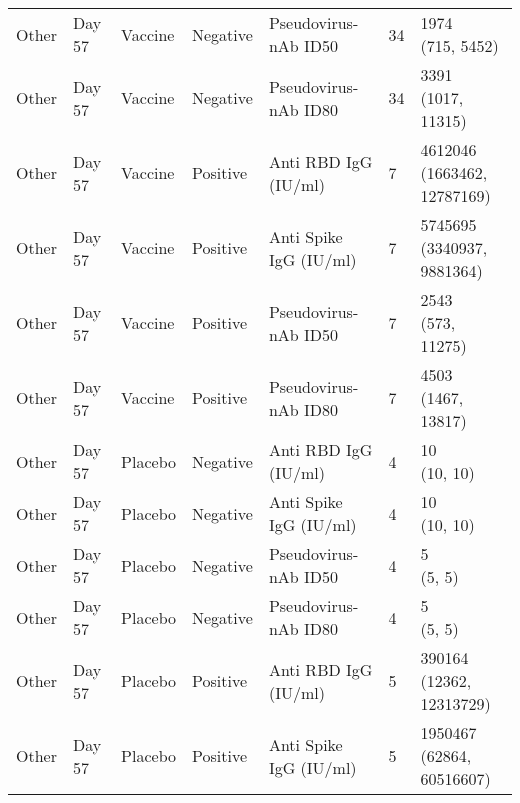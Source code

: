 \documentclass[]{book}
\theoremstyle{definition}
\theoremstyle{definition}
\theoremstyle{definition}
\newcommand{\1}{\mathbbm{1}}
\begin{document}
\begin{landscape}
\begin{ThreePartTable}
\begin{longtable}[t]{>{\raggedright\arraybackslash}p{7cm}llllll}
\hspace{1em}Other & Day 57 & Vaccine & Negative & Pseudovirus-nAb ID50 & 34 & \makecell[l]{1974\\(715, 5452)}\\
\hspace{1em}Other & Day 57 & Vaccine & Negative & Pseudovirus-nAb ID80 & 34 & \makecell[l]{3391\\(1017, 11315)}\\
\hspace{1em}Other & Day 57 & Vaccine & Positive & Anti RBD IgG (IU/ml) & 7 & \makecell[l]{4612046\\(1663462, 12787169)}\\
\hspace{1em}Other & Day 57 & Vaccine & Positive & Anti Spike IgG (IU/ml) & 7 & \makecell[l]{5745695\\(3340937, 9881364)}\\
\hspace{1em}Other & Day 57 & Vaccine & Positive & Pseudovirus-nAb ID50 & 7 & \makecell[l]{2543\\(573, 11275)}\\
\hspace{1em}Other & Day 57 & Vaccine & Positive & Pseudovirus-nAb ID80 & 7 & \makecell[l]{4503\\(1467, 13817)}\\
\hspace{1em}Other & Day 57 & Placebo & Negative & Anti RBD IgG (IU/ml) & 4 & \makecell[l]{10\\(10, 10)}\\
\hspace{1em}Other & Day 57 & Placebo & Negative & Anti Spike IgG (IU/ml) & 4 & \makecell[l]{10\\(10, 10)}\\
\hspace{1em}Other & Day 57 & Placebo & Negative & Pseudovirus-nAb ID50 & 4 & \makecell[l]{5\\(5, 5)}\\
\hspace{1em}Other & Day 57 & Placebo & Negative & Pseudovirus-nAb ID80 & 4 & \makecell[l]{5\\(5, 5)}\\
\hspace{1em}Other & Day 57 & Placebo & Positive & Anti RBD IgG (IU/ml) & 5 & \makecell[l]{390164\\(12362, 12313729)}\\
\hspace{1em}Other & Day 57 & Placebo & Positive & Anti Spike IgG (IU/ml) & 5 & \makecell[l]{1950467\\(62864, 60516607)}\\

\end{longtable}
\end{ThreePartTable}
\end{landscape}
\end{document}
